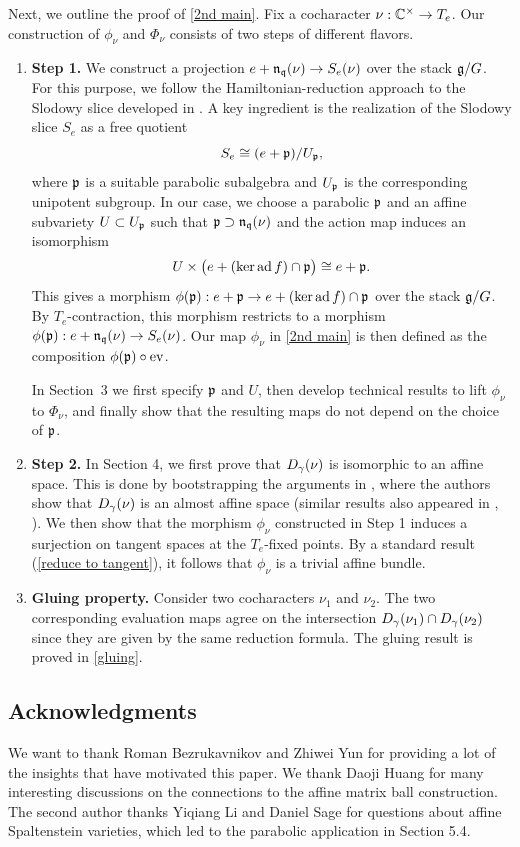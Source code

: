 \documentclass[11pt]{article}
\numberwithin{equation}{section}
\begin{document}
Next, we outline the proof of \cref{2nd main}. Fix a cocharacter
$\nu:\mathbb{C}^\times\to T_e$. Our construction of $\phi_\nu$ and
$\Phi_\nu$ consists of two steps of different flavors. 
\begin{enumerate}
    \item \textbf{Step 1.} We construct a projection $e+\mathfrak{n}_{\mathfrak{q}}(\nu)\to S_e(\nu)$ over the stack $\mathfrak{g}/G$. For this purpose, we follow the Hamiltonian-reduction approach to the Slodowy slice developed in \cite{GG2002}. A key ingredient is the realization of the Slodowy slice $S_e$ as a free quotient
$$S_e\cong (e+\mathfrak{p})/U_{\mathfrak{p}},$$
where $\mathfrak{p}$ is a suitable parabolic subalgebra and $U_{\mathfrak{p}}$ is the corresponding unipotent subgroup. In our case, we choose a parabolic $\mathfrak{p}$ and an affine subvariety $U\subset U_{\mathfrak{p}}$ such that $\mathfrak{p}\supset \mathfrak{n}_{\mathfrak{q}}(\nu)$ and the action map induces an isomorphism
$$U\times \bigl(e+(\ker \operatorname{ad} f)\cap \mathfrak{p}\bigr)\cong e+\mathfrak{p}.$$ 
This gives a morphism $\phi(\mathfrak{p}): e+\mathfrak{p}\to e+(\ker \operatorname{ad} f)\cap \mathfrak{p}$ over the stack $\mathfrak{g}/G$. By $T_e$-contraction, this morphism restricts to a morphism $\phi(\mathfrak{p}): e+\mathfrak{n}_{\mathfrak{q}}(\nu)\to S_e(\nu)$. Our map $\phi_\nu$ in \cref{2nd main} is then defined as the composition $\phi(\mathfrak{p})\circ \operatorname{ev}$.

In Section~3 we first specify $\mathfrak{p}$ and $U$, then develop technical results to lift $\phi_\nu$ to $\Phi_\nu$, and finally show that the resulting maps do not depend on the choice of $\mathfrak{p}$. 

    \item \textbf{Step 2.} In Section 4, we first prove that $D_\gamma(\nu)$ is isomorphic to an affine space. This is done by bootstrapping the arguments in \cite[Section 5]{KL88}, where the authors show that $D_\gamma(\nu)$ is an almost affine space (similar results also appeared in \cite{YunPCMI}, \cite{Chen17}). We then show that the morphism $\phi_\nu$ constructed in Step 1 induces a surjection on tangent spaces at the $T_e$-fixed points. By a standard result (\cref{reduce to tangent}), it follows that $\phi_\nu$ is a trivial affine bundle.

    
    \item \textbf{Gluing property.} 
    Consider two cocharacters $\nu_1$ and $\nu_2$. The two corresponding evaluation maps agree on the intersection $D_\gamma(\nu_1)\cap D_\gamma(\nu_2)$ since they are given by the same reduction formula. The gluing result is proved in \cref{gluing}.
    
\end{enumerate}

\subsection{Acknowledgments} We want to thank Roman Bezrukavnikov and Zhiwei Yun for providing a lot of the insights that have motivated this paper. We thank Daoji Huang for many interesting discussions on the connections to the affine matrix ball construction. The second author thanks Yiqiang Li and Daniel Sage for questions about affine
Spaltenstein varieties, which led to the parabolic application in Section 5.4.
\end{document}
